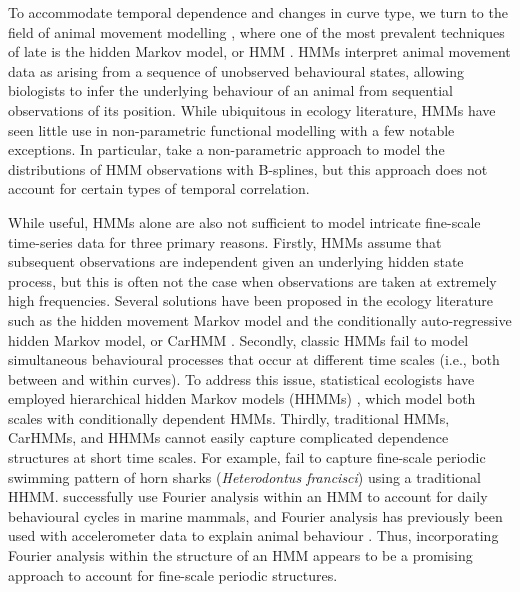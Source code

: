 To accommodate temporal dependence and changes in curve type, we turn to the field of
animal movement modelling \citep{Hooten:2017}, where one of the most prevalent techniques of late is the hidden Markov model, or HMM \citep{Patterson:2017,McClintock:2020}. HMMs interpret animal movement data as arising from a sequence of unobserved behavioural states, allowing biologists to infer the underlying behaviour of an animal from sequential observations of its position. While ubiquitous in ecology literature, HMMs have seen little use in non-parametric functional modelling with a few notable exceptions. In particular, \citet{Langrock:2018} take a non-parametric approach to model the distributions of HMM observations with B-splines, 
but this approach does not account for certain types of temporal correlation.

While useful, HMMs alone are also not sufficient to model intricate fine-scale time-series data for three primary reasons.
%
Firstly, HMMs assume that subsequent observations are independent given an underlying hidden state process, but this is often not the case when observations are taken at extremely high frequencies. 
Several solutions have been proposed in the ecology literature such as the hidden movement Markov model \citep{Whoriskey:2016} and the conditionally auto-regressive hidden Markov model, or CarHMM \citep{Lawler:2019}. 
%
Secondly, classic HMMs fail to model simultaneous behavioural processes that occur at different time scales (i.e., both between and within curves). 
To address this issue, statistical ecologists have employed hierarchical hidden Markov models (HHMMs) \citep{Barajas:2017,Adam:2019}, which model both scales with conditionally dependent HMMs.
%
Thirdly, traditional HMMs, CarHMMs, and HHMMs cannot easily capture complicated dependence structures at short time scales. For example, \citet{Adam:2019} fail to capture fine-scale periodic swimming pattern of horn sharks (\textit{Heterodontus francisci}) using a traditional HHMM. \citet{Heerah:2017} successfully use Fourier analysis within an HMM to account for %
daily behavioural cycles in marine mammals, and Fourier analysis has previously been used with accelerometer data to explain animal behaviour \citep{Fehlmann:2017,Shorter:2017}. Thus, incorporating Fourier analysis within the structure of an HMM appears to be a promising approach to account for fine-scale periodic structures.

